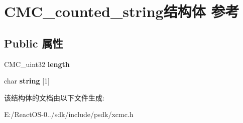 \hypertarget{struct_c_m_c__counted__string}{}\section{C\+M\+C\+\_\+counted\+\_\+string结构体 参考}
\label{struct_c_m_c__counted__string}
\subsection*{Public 属性}
\begin{DoxyCompactItemize}
\item 
\mbox{\label{struct_c_m_c__counted__string_a90db88a12754b6a7bf789deb4aa2ed28}} 
C\+M\+C\+\_\+uint32 {\bfseries length}
\item 
\mbox{\label{struct_c_m_c__counted__string_afb6268a8a50bc1177cde59170aae4e82}} 
char {\bfseries string} \mbox{[}1\mbox{]}
\end{DoxyCompactItemize}


该结构体的文档由以下文件生成\+:\begin{DoxyCompactItemize}
\item 
E\+:/\+React\+O\+S-\/0../sdk/include/psdk/xcmc.\+h\end{DoxyCompactItemize}
